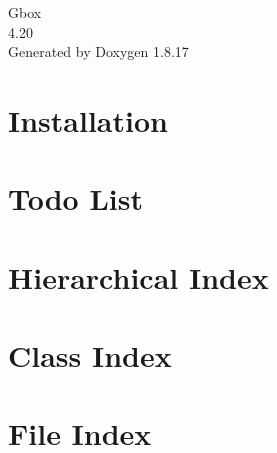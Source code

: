 \let\mypdfximage\pdfximage\def\pdfximage{\immediate\mypdfximage}\documentclass[twoside]{book}
\newcommand{\+}{\discretionary{\mbox{\scriptsize$\hookleftarrow$}}{}{}}
\newcommand{\clearemptydoublepage}{%
  \newpage{\pagestyle{empty}\cleardoublepage}%
}
\begin{document}
\hypersetup{pageanchor=false,
             bookmarksnumbered=true,
             pdfencoding=unicode
            }
\begin{titlepage}
\vspace*{7cm}
\begin{center}%
{\Large Gbox \\[1ex]\large 4.\+20 }\\
\vspace*{1cm}
{\large Generated by Doxygen 1.8.17}\\
\end{center}
\end{titlepage}
\clearemptydoublepage
{}
\tableofcontents
\clearemptydoublepage
{}
\hypersetup{pageanchor=true}

\chapter{Installation}
\label{index}\hypertarget{index}{}
\chapter{Todo List}
\label{todo}

\chapter{Hierarchical Index}

\chapter{Class Index}

\chapter{File Index}

\end{document}
